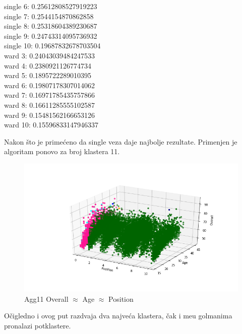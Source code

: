 \documentclass[a4paper, 11pt]{article}
\begin{document}
{\begin{multicols}{2}
single
6:
0.25612808527919223\\

single
7:
0.2544154870862858\\

single
8:
0.25318604389230687\\

single
9:
0.24743314095736932\\

single
10:
0.19687832678703504\\

ward
3:
0.24043039484247533\\

ward
4:
0.2380921126774734\\

ward
5:
0.1895722289010395\\

ward
6:
0.19807178307014062\\

ward
7:
0.16971785435757866\\

ward
8:
0.16611285555102587\\

ward
9:
0.15481562166653126\\

ward
10: 
0.15596833147946337
\end{multicols}
}
Nakon \v{s}to je prime\'{c}eno da single veza daje najbolje rezultate.
Primenjen je algoritam ponovo za broj klastera 11.

\begin{figure}[h]
\centering
\graphicspath{{../}}
\includegraphics[scale=0.45]{agglomerative_11_3d_overall_age_position.png}
\caption{Agg11 Overall $\approx$ Age $\approx$ Position}
\end{figure}
O\v{c}igledno i ovog put razdvaja dva najve\'{c}a klastera, \v{c}ak
i me\dj{}u golmanima pronalazi potklastere. \\
\end{document}
